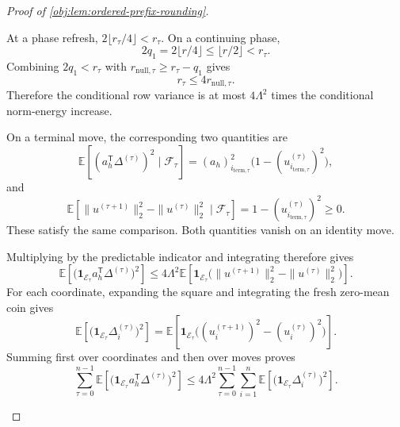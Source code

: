 \begin{proof}[Proof of \cref{obj:lem:ordered-prefix-rounding}]
\begin{enumerate}
At a phase refresh,
\(2\lfloor r_\tau/4\rfloor<r_\tau\). On a continuing phase,
\[
2q_1=2\lfloor r/4\rfloor
\leq\lfloor r/2\rfloor<r_\tau.
\]
Combining \(2q_1<r_\tau\) with
\(r_{\mathrm{null},\tau}\geq r_\tau-q_1\) gives
\[
r_\tau\leq4r_{\mathrm{null},\tau}.
\]
Therefore the conditional row variance is at most \(4\Lambda^2\) times the conditional norm-energy increase.

On a terminal move, the corresponding two quantities are
\[
\mathbb E\!\left[(a_h^{\mathsf T}\Delta^{(\tau)})^2\mid\mathcal F_\tau\right]
=(a_h)_{i_{\mathrm{term},\tau}}^2
\bigl(1-(u_{i_{\mathrm{term},\tau}}^{(\tau)})^2\bigr),
\]
and
\[
\mathbb E\!\left[
\|u^{(\tau+1)}\|_2^2-\|u^{(\tau)}\|_2^2
\mid\mathcal F_\tau\right]
=1-(u_{i_{\mathrm{term},\tau}}^{(\tau)})^2\geq0.
\]
These satisfy the same comparison. Both quantities vanish on an identity move.

Multiplying by the predictable indicator and integrating therefore gives
\[
\mathbb E\!\left[
\bigl(\mathbf1_{\mathcal E_\tau}a_h^{\mathsf T}\Delta^{(\tau)}\bigr)^2
\right]
\leq
4\Lambda^2
\mathbb E\!\left[
\mathbf1_{\mathcal E_\tau}
\bigl(\|u^{(\tau+1)}\|_2^2-\|u^{(\tau)}\|_2^2\bigr)
\right].
\]
For each coordinate, expanding the square and integrating the fresh zero-mean coin gives
\[
\mathbb E\!\left[
\bigl(\mathbf1_{\mathcal E_\tau}\Delta_i^{(\tau)}\bigr)^2
\right]
=
\mathbb E\!\left[
\mathbf1_{\mathcal E_\tau}
\bigl((u_i^{(\tau+1)})^2-(u_i^{(\tau)})^2\bigr)
\right].
\]
Summing first over coordinates and then over moves proves
\[
\sum_{\tau=0}^{n-1}
\mathbb E\!\left[
\bigl(\mathbf1_{\mathcal E_\tau}a_h^{\mathsf T}\Delta^{(\tau)}\bigr)^2
\right]
\leq
4\Lambda^2
\sum_{\tau=0}^{n-1}\sum_{i=1}^n
\mathbb E\!\left[
\bigl(\mathbf1_{\mathcal E_\tau}\Delta_i^{(\tau)}\bigr)^2
\right].
\]


\end{enumerate}
\end{proof}
